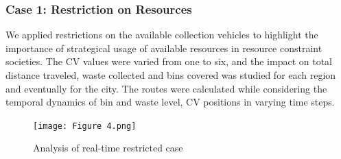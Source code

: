 \documentclass[12pt]{article}
\begin{document}
\subsubsection*{Case 1: Restriction on Resources}
We applied restrictions on the available collection vehicles to highlight the importance of strategical usage of available resources in resource constraint societies. The CV values were varied from one to six, and the impact on total distance traveled, waste collected and bins covered was studied for each region and eventually for the city. The routes were calculated while considering the temporal dynamics of bin and waste level, CV positions in varying time steps.
\begin{figure}[H]
    \centering
    \texttt{[image: Figure 4.png]}
    \caption{Analysis of real-time restricted case}\label{figcom}
\end{figure}
\end{document}
